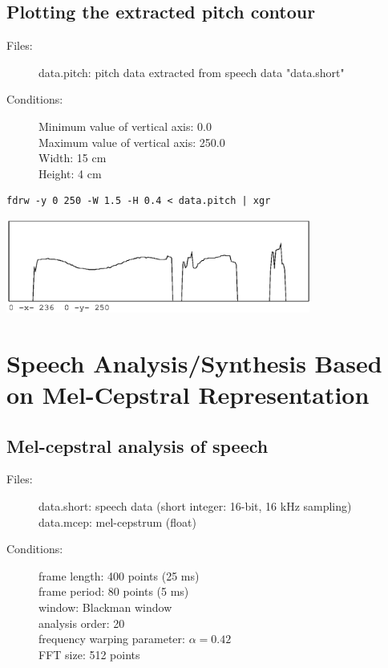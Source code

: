\documentclass[a4paper,10pt]{article}
\begin{document}
\subsection{Plotting the extracted pitch contour}

\begin{description}
\item[Files:]
  data.pitch: pitch data extracted from speech data "data.short"
\item[Conditions:]
  Minimum value of vertical axis: 0.0\\
  Maximum value of vertical axis: 250.0\\
  Width: 15 cm\\
  Height: 4 cm
\end{description}

\begin{verbatim}
fdrw -y 0 250 -W 1.5 -H 0.4 < data.pitch | xgr
\end{verbatim}

\includegraphics[width=10cm]{data.pitch.fdrw.eps}

\section{Speech Analysis/Synthesis Based on Mel-Cepstral Representation}

\subsection{Mel-cepstral analysis of speech}

\begin{description}
\item[Files:]
  data.short: speech data (short integer: 16-bit, 16 kHz sampling)\\
  data.mcep: mel-cepstrum (float)
\item[Conditions:]
  frame length: 400 points (25 ms)\\
  frame period: 80 points (5 ms)\\
  window: Blackman window\\
  analysis order: 20\\
  frequency warping parameter: $\alpha = 0.42$\\
  FFT size: 512 points
\end{description}
\end{document}
